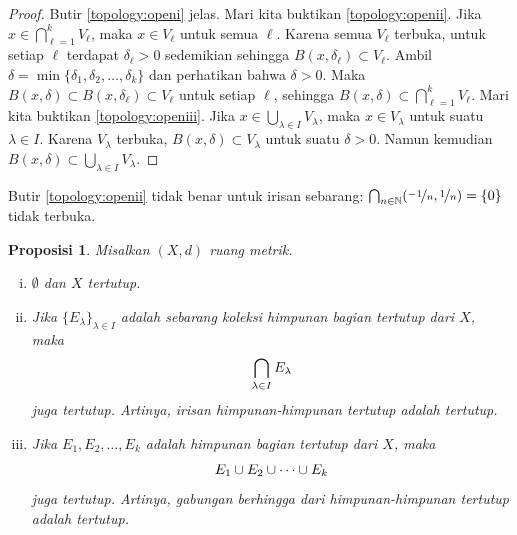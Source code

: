 \documentclass[12pt,openany]{book}
\newcommand{\avoidbreak}{\postdisplaypenalty=100}
\newcommand{\N}{{\mathbb{N}}}
\theoremstyle{plain}
\newtheorem{prop}[thm]{Proposisi}
\theoremstyle{remark}
\theoremstyle{definition}
\theoremstyle{exercise}
\theoremstyle{example}
\begin{document}

\begin{proof}
Butir \ref{topology:openi} jelas.
%
Mari kita buktikan \ref{topology:openii}.
Jika $x \in \bigcap_{\ell=1}^k V_\ell$, maka $x \in V_\ell$ untuk semua $\ell$.
Karena semua $V_\ell$ terbuka, untuk setiap $\ell$ terdapat $\delta_\ell > 0$
sedemikian sehingga $B(x,\delta_\ell) \subset V_\ell$. Ambil $\delta = \min \{
\delta_1,\delta_2,\ldots,\delta_k \}$ dan perhatikan bahwa $\delta > 0$. Maka
$B(x,\delta) \subset B(x,\delta_\ell) \subset V_\ell$ untuk setiap $\ell$, sehingga
$B(x,\delta) \subset \bigcap_{\ell=1}^k V_\ell$.
%
Mari kita buktikan \ref{topology:openiii}.
Jika $x \in \bigcup_{\lambda \in I} V_\lambda$, maka $x \in V_\lambda$ untuk suatu
$\lambda \in I$.
Karena $V_\lambda$ terbuka,
$B(x,\delta) \subset V_\lambda$
untuk suatu $\delta > 0$.
Namun kemudian $B(x,\delta) \subset \bigcup_{\lambda \in I} V_\lambda$.
\end{proof}

Butir \ref{topology:openii} tidak benar untuk irisan sebarang:
$\bigcap_{n \in \N} (\nicefrac{-1}{n},\nicefrac{1}{n}) = \{ 0
\}$ tidak terbuka.

\begin{prop} \label{prop:topology:closed}
Misalkan $(X,d)$ ruang metrik.
\begin{enumerate}[(i)]
\item \label{topology:closedi} $\emptyset$ dan $X$ tertutup.
\item \label{topology:closedii} Jika $\{ E_\lambda \}_{\lambda \in I}$ adalah
sebarang koleksi himpunan bagian tertutup dari $X$, maka
\begin{equation*}
\bigcap_{\lambda \in I} E_\lambda
\avoidbreak
\end{equation*}
juga tertutup. Artinya, irisan himpunan-himpunan tertutup adalah tertutup.
\item \label{topology:closediii} Jika $E_1, E_2, \ldots, E_k$ adalah himpunan bagian
tertutup dari $X$, maka
\begin{equation*}
E_1 \cup E_2 \cup \cdots \cup E_k
\avoidbreak
\end{equation*}
juga tertutup. Artinya, gabungan berhingga dari himpunan-himpunan tertutup adalah tertutup.
\end{enumerate}
\end{prop}
\end{document}
